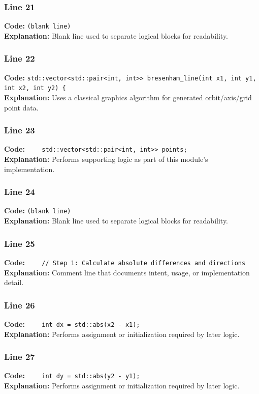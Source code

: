 \documentclass[11pt,a4paper]{article}
\begin{document}
\subsubsection*{Line 21}
\textbf{Code:} \texttt{(blank line)}\\
\textbf{Explanation:} Blank line used to separate logical blocks for readability.

\subsubsection*{Line 22}
\textbf{Code:} \verb|std::vector<std::pair<int, int>> bresenham_line(int x1, int y1, int x2, int y2) {|\\
\textbf{Explanation:} Uses a classical graphics algorithm for generated orbit/axis/grid point data.

\subsubsection*{Line 23}
\textbf{Code:} \verb|    std::vector<std::pair<int, int>> points;|\\
\textbf{Explanation:} Performs supporting logic as part of this module's implementation.

\subsubsection*{Line 24}
\textbf{Code:} \texttt{(blank line)}\\
\textbf{Explanation:} Blank line used to separate logical blocks for readability.

\subsubsection*{Line 25}
\textbf{Code:} \verb|    // Step 1: Calculate absolute differences and directions|\\
\textbf{Explanation:} Comment line that documents intent, usage, or implementation detail.

\subsubsection*{Line 26}
\textbf{Code:} \verb|    int dx = std::abs(x2 - x1);|\\
\textbf{Explanation:} Performs assignment or initialization required by later logic.

\subsubsection*{Line 27}
\textbf{Code:} \verb|    int dy = std::abs(y2 - y1);|\\
\textbf{Explanation:} Performs assignment or initialization required by later logic.
\end{document}
